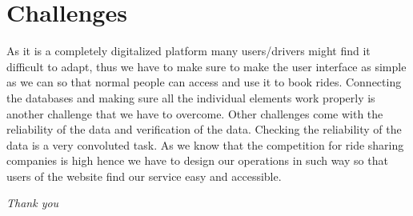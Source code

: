 \documentclass[12pt,a4paper]{article}
\begin{document}
\section*{Challenges}
As it is a completely digitalized platform many users/drivers might find it difficult to adapt, thus we have to make sure to make the user interface as simple as we can so that normal people can access and use it to book rides. Connecting the databases and making sure all the individual elements work properly is another challenge that we have to overcome. Other challenges come with the reliability of the data and verification of the data. Checking the reliability of the data is a very convoluted task. As we know that the competition for ride sharing companies is high hence we have to design our operations in such way so that users of the website find our service easy and accessible.
\vspace{11cm}
\begin{center}
 \textit{{\small Thank you}}
\end{center} 
\end{document}
